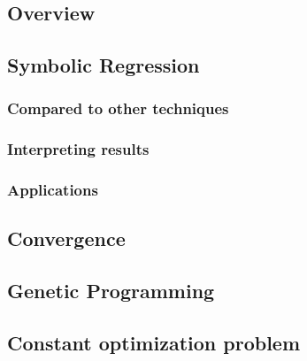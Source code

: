 \subsection{Overview}

\subsection{Symbolic Regression}

\subsubsection{Compared to other techniques}

\subsubsection{Interpreting results}

\subsubsection{Applications}

\subsection{Convergence}

\subsection{Genetic Programming}

\subsection{Constant optimization problem}